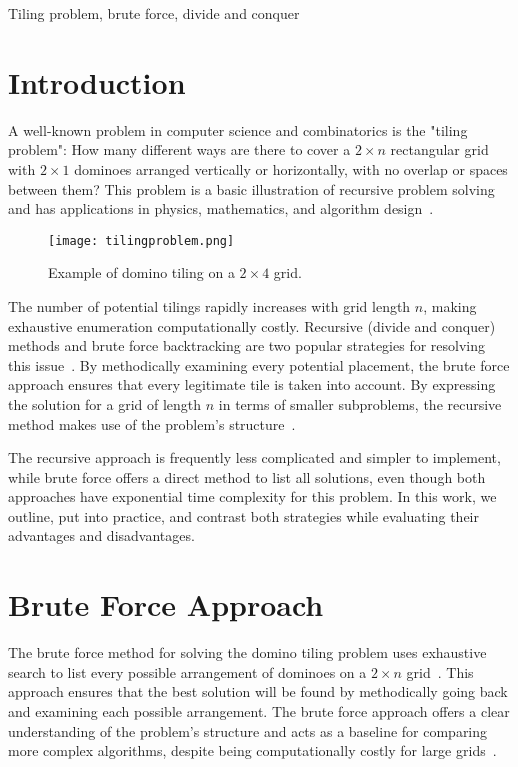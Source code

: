 \documentclass[conference]{IEEEtran}
\begin{document}
\begin{IEEEkeywords}
Tiling problem, brute force, divide and conquer
\end{IEEEkeywords}

\section{Introduction}
A well-known problem in computer science and combinatorics is the "tiling problem": How many different ways are there to cover a $2 \times n$ rectangular grid with $2 \times 1$ dominoes arranged vertically or horizontally, with no overlap or spaces between them? This problem is a basic illustration of recursive problem solving and has applications in physics, mathematics, and algorithm design~\cite{b2, b1}.

\begin{figure}[htbp]
\centerline{\texttt{[image: tilingproblem.png]}}
\caption{Example of domino tiling on a $2 \times 4$ grid.}
\label{fig:tiling_example}
\end{figure}

The number of potential tilings rapidly increases with grid length $n$, making exhaustive enumeration computationally costly. Recursive (divide and conquer) methods and brute force backtracking are two popular strategies for resolving this issue~\cite{b3, b4}. By methodically examining every potential placement, the brute force approach ensures that every legitimate tile is taken into account. By expressing the solution for a grid of length $n$ in terms of smaller subproblems, the recursive method makes use of the problem's structure~\cite{b1, b2}.

The recursive approach is frequently less complicated and simpler to implement, while brute force offers a direct method to list all solutions, even though both approaches have exponential time complexity for this problem. In this work, we outline, put into practice, and contrast both strategies while evaluating their advantages and disadvantages.

\section{Brute Force Approach}

The brute force method for solving the domino tiling problem uses exhaustive search to list every possible arrangement of dominoes on a $2 \times n$ grid~\cite{b3}. This approach ensures that the best solution will be found by methodically going back and examining each possible arrangement. The brute force approach offers a clear understanding of the problem's structure and acts as a baseline for comparing more complex algorithms, despite being computationally costly for large grids~\cite{b4}.
\end{document}
